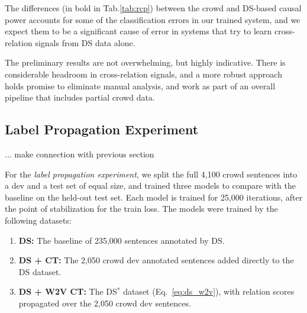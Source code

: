 The differences (in bold in Tab.\ref{tab:rcp}) between the crowd and DS-based causal power accounts for some of the classification errors in our trained system, and we expect them to be a significant cause of error in systems that try to learn cross-relation signals from DS data alone.

\begin{table}[htb!]
\caption{Precision \& Recall at 20,000 training steps.}
\label{tab:cnn_res}
\centering
{}
\end{table}

The preliminary results are not overwhelming, but highly indicative.  There is considerable headroom in cross-relation signals, and a more robust approach holds promise to eliminate manual analysis, and work as part of an overall pipeline that includes partial crowd data.


\subsection{Label Propagation Experiment}

... make connection with previous section

For the \textit{label propagation experiment}, we split the full 4,100 crowd sentences into a dev and a test set of equal size, and trained three models to compare with the baseline on the held-out test set. Each model is trained for 25,000 iterations, after the point of stabilization for the train loss. The models were trained by the following datasets:

\begin{enumerate}
\item \textbf{DS:} The baseline of 235,000 sentences annotated by DS.
\item \textbf{DS + CT:} The 2,050 crowd dev annotated sentences added directly to the DS dataset.
\item \textbf{DS + W2V CT:} The DS$^{*}$ dataset (Eq.~\ref{eq:ds_w2v}), with relation scores propagated over the 2,050 crowd dev sentences.
\end{enumerate}


